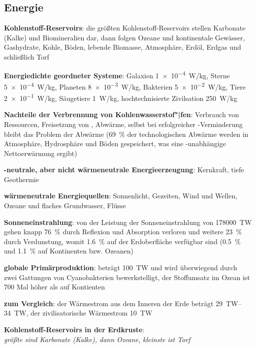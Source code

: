 \pagebreak

\subsection{%
    Energie%
}

\textbf{Kohlenstoff-Reservoirs}:
die größten Kohlenstoff-Reservoirs stellen Karbonate (Kalke) und Biomineralien dar,
dann folgen Ozeane und kontinentale Gewässer,
Gashydrate,
Kohle,
Böden,
lebende Biomasse,
Atmosphäre,
Erdöl,
Erdgas und
schließlich Torf

\textbf{Energiedichte geordneter Systeme}:
Galaxien \SI{1e-4}{\watt/\kilogram},
Sterne \SI{5e-4}{\watt/\kilogram},
Planeten \SI{8e-3}{\watt/\kilogram},
Bakterien \SI{5e-2}{\watt/\kilogram},
Tiere \SI{2e-1}{\watt/\kilogram},
Säugetiere \SI{1}{\watt/\kilogram},
hochtechnisierte Zivilsation \SI{250}{\watt/\kilogram}

\textbf{Nachteile der Verbrennung von Kohlenwasserstof"|fen}:
Verbrauch von Ressourcen,
Freisetzung von ,
Abwärme,
selbst bei erfolgreicher -Verminderung bleibt das Problem der Abwärme
(\SI{69}{\percent} der technologischen Abwärme werden in Atmosphäre, Hydrosphäre und Böden
gespeichert, was eine -unabhängige Nettoerwärmung ergibt)

\textbf{-neutrale, aber nicht wärmeneutrale Energieerzeugung}:
Kernkraft,
tiefe Geothermie

\textbf{wärmeneutrale Energiequellen}:
Sonnenlicht,
Gezeiten,
Wind und Wellen,
Ozeane und flaches Grundwasser,
Flüsse

\textbf{Sonneneinstrahlung}:
von der Leistung der Sonneneinstrahlung von \SI{178000}{\tera\watt}
gehen knapp \SI{76}{\percent} durch Reflexion und Absorption verloren
und weitere \SI{23}{\percent} durch Verdunstung,
womit \SI{1.6}{\percent} auf der Erdoberfläche verfügbar sind
(\SI{0.5}{\percent} und \SI{1.1}{\percent} auf Kontinenten bzw. Ozeanen)

\textbf{globale Primärproduktion}:
beträgt \SI{100}{\tera\watt} und wird überwiegend durch zwei Gattungen von Cyanobakterien
bewerkstelligt,
der Stoffumsatz im Ozean ist 700 Mal höher als auf Kontienten

\textbf{zum Vergleich}:
der Wärmestrom aus dem Inneren der Erde beträgt \SIrange{29}{34}{\tera\watt},
der zivilisatorische Wärmestrom \SI{10}{\tera\watt}

\begin{wichtig}
    \item
    \textbf{Kohlenstoff-Reservoirs in der Erdkruste}:\\
    \emph{größte sind Karbonate (Kalke), dann Ozeane, kleinste ist Torf}
\end{wichtig}

\pagebreak

